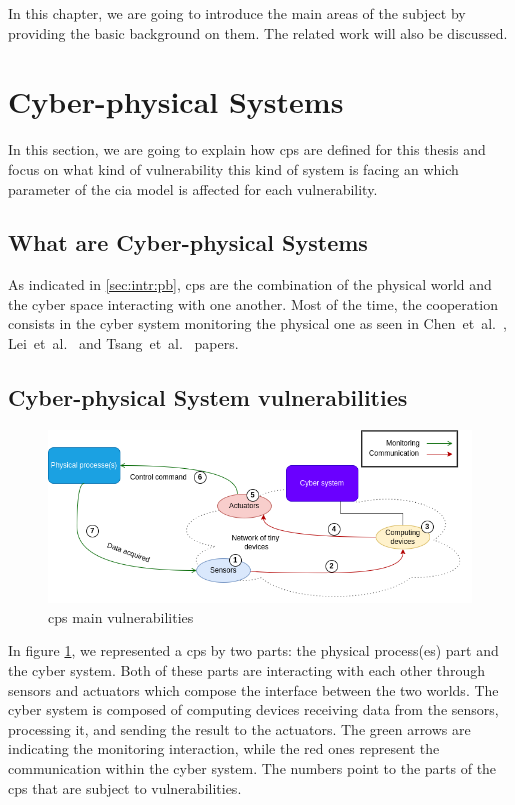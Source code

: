 \documentclass[12pt]{report}
\begin{document}
In this chapter, we are going to introduce the main areas of the subject by providing the basic background on them. The related work will also be discussed.

\section{Cyber-physical Systems}
\label{sec:bg:cps}
In this section, we are going to explain how \gls{cps} are defined for this thesis and focus on what kind of vulnerability this kind of system is facing an which parameter of the \gls{cia} model is affected for each vulnerability.

\subsection{What are Cyber-physical Systems}
\label{sec:bg:cps:intr}
As indicated in \ref{sec:intr:pb}, \gls{cps} are the combination of the physical world and the cyber space interacting with one another. Most of the time, the cooperation consists in the cyber system monitoring the physical one as seen in Chen~et~al.~\cite{chen_cyber-physical_2022}, Lei~et~al.~\cite{lei_developing_2013} and Tsang~et~al.~\cite{tsang_how_2022} papers. 

\subsection{Cyber-physical System vulnerabilities}
\label{sec:bg:cps:vuln}
\begin{figure}[h!]
    \centering
    \includegraphics[width = \textwidth]{mind_map_cps_bis.png}
    \caption{\gls{cps} main vulnerabilities}
    \label{fig:cps_vuln}
\end{figure}

In figure \ref{fig:cps_vuln}, we represented a \gls{cps} by two parts: the physical process(es) part and the cyber system. Both of these parts are interacting with each other through sensors and actuators which compose the interface between the two worlds. The cyber system is composed of computing devices receiving data from the sensors, processing it, and sending the result to the actuators.
The green arrows are indicating the monitoring interaction, while the red ones represent the communication within the cyber system.
The numbers point to the parts of the \gls{cps} that are subject to vulnerabilities.
\end{document}
